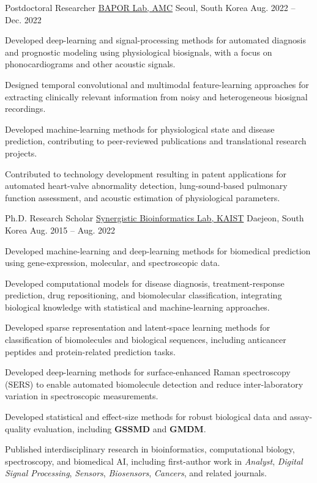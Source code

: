 \begin{cventries}
\cventry
{Postdoctoral Researcher} %
{\href{https://signalhouse.kr/}{BAPOR Lab, AMC}} %
{Seoul, South Korea} %
{Aug. 2022 -- Dec. 2022} %
{
	\begin{cvitems} %
		\item {Developed deep-learning and signal-processing methods for automated diagnosis and prognostic modeling using physiological biosignals, with a focus on phonocardiograms and other acoustic signals.}
		\item {Designed temporal convolutional and multimodal feature-learning approaches for extracting clinically relevant information from noisy and heterogeneous biosignal recordings.}
		\item {Developed machine-learning methods for physiological state and disease prediction, contributing to peer-reviewed publications and translational research projects.}
		\item {Contributed to technology development resulting in patent applications for automated heart-valve abnormality detection, lung-sound-based pulmonary function assessment, and acoustic estimation of physiological parameters.}
	\end{cvitems}
}

\cventry
{Ph.D. Research Scholar} %
{\href{https://synbi.kaist.ac.kr/}{Synergistic Bioinformatics Lab, KAIST}} %
{Daejeon, South Korea} %
{Aug. 2015 -- Aug. 2022} %
{
	\begin{cvitems} %
		\item {Developed machine-learning and deep-learning methods for biomedical prediction using gene-expression, molecular, and spectroscopic data.}
		\item {Developed computational models for disease diagnosis, treatment-response prediction, drug repositioning, and biomolecular classification, integrating biological knowledge with statistical and machine-learning approaches.}
		\item {Developed sparse representation and latent-space learning methods for classification of biomolecules and biological sequences, including anticancer peptides and protein-related prediction tasks.}
		\item {Developed deep-learning methods for surface-enhanced Raman spectroscopy (SERS) to enable automated biomolecule detection and reduce inter-laboratory variation in spectroscopic measurements.}
		\item {Developed statistical and effect-size methods for robust biological data and assay-quality evaluation, including \textbf{GSSMD} and \textbf{GMDM}.}
		\item {Published interdisciplinary research in bioinformatics, computational biology, spectroscopy, and biomedical AI, including first-author work in \textit{Analyst}, \textit{Digital Signal Processing}, \textit{Sensors}, \textit{Biosensors}, \textit{Cancers}, and related journals.}
	\end{cvitems}
}


\end{cventries}
